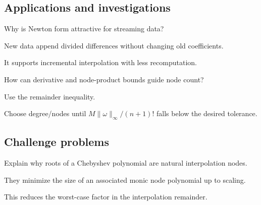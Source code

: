 \subsection*{Applications and investigations}

\begin{exercise}\label{exr:ii20-expand-13}
Why is Newton form attractive for streaming data?
\end{exercise}
\begin{hint}
New data append divided differences without changing old coefficients.
\end{hint}
\begin{solution}
It supports incremental interpolation with less recomputation.
\end{solution}

\begin{exercise}\label{exr:ii20-expand-14}
How can derivative and node-product bounds guide node count?
\end{exercise}
\begin{hint}
Use the remainder inequality.
\end{hint}
\begin{solution}
Choose degree/nodes until \(M\|\omega\|_\infty/(n+1)!\) falls below the desired tolerance.
\end{solution}

\subsection*{Challenge problems}

\begin{exercise}\label{exr:ii20-expand-15}
Explain why roots of a Chebyshev polynomial are natural interpolation nodes.
\end{exercise}
\begin{hint}
They minimize the size of an associated monic node polynomial up to scaling.
\end{hint}
\begin{solution}
This reduces the worst-case factor in the interpolation remainder.
\end{solution}

